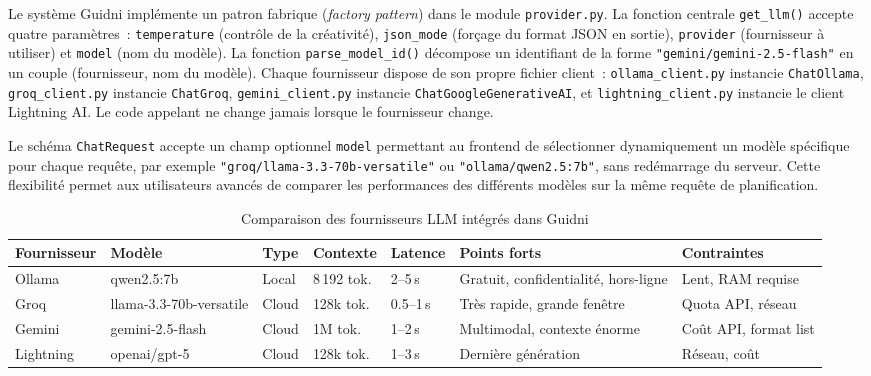 Le système Guidni implémente un patron fabrique (\textit{factory pattern}) dans le module
\texttt{provider.py}. La fonction centrale \texttt{get\_llm()} accepte quatre paramètres~:
\texttt{temperature} (contrôle de la créativité), \texttt{json\_mode} (forçage du format JSON
en sortie), \texttt{provider} (fournisseur à utiliser) et \texttt{model} (nom du modèle). La
fonction \texttt{parse\_model\_id()} décompose un identifiant de la forme
\texttt{"gemini/gemini-2.5-flash"} en un couple (fournisseur, nom du modèle). Chaque fournisseur
dispose de son propre fichier client~: \texttt{ollama\_client.py} instancie \texttt{ChatOllama},
\texttt{groq\_client.py} instancie \texttt{ChatGroq}, \texttt{gemini\_client.py} instancie
\texttt{ChatGoogleGenerativeAI}, et \texttt{lightning\_client.py} instancie le client Lightning AI.
Le code appelant ne change jamais lorsque le fournisseur change.

Le schéma \texttt{ChatRequest} accepte un champ optionnel \texttt{model} permettant au frontend
de sélectionner dynamiquement un modèle spécifique pour chaque requête, par exemple
\texttt{"groq/llama-3.3-70b-versatile"} ou \texttt{"ollama/qwen2.5:7b"}, sans redémarrage du
serveur. Cette flexibilité permet aux utilisateurs avancés de comparer les performances des
différents modèles sur la même requête de planification.

\begin{table}[H]
    \centering
    \caption{Comparaison des fournisseurs LLM intégrés dans Guidni}
    \label{tab:llm_providers}
    \small
    \begin{tabular}{p{1.8cm} p{2.8cm} p{1.2cm} p{1.5cm} p{1.3cm} p{2.5cm} p{2.5cm}}
        \toprule
        \textbf{Fournisseur} & \textbf{Modèle} & \textbf{Type} & \textbf{Contexte} &
        \textbf{Latence} & \textbf{Points forts} & \textbf{Contraintes} \\
        \midrule
        Ollama & qwen2.5:7b & Local & 8\,192 tok. & 2--5\,s &
        Gratuit, confidentialité, hors-ligne & Lent, RAM requise \\[4pt]
        Groq & llama-3.3-70b-versatile & Cloud & 128k tok. & 0.5--1\,s &
        Très rapide, grande fenêtre & Quota API, réseau \\[4pt]
        Gemini & gemini-2.5-flash & Cloud & 1M tok. & 1--2\,s &
        Multimodal, contexte énorme & Coût API, format list \\[4pt]
        Lightning & openai/gpt-5 & Cloud & 128k tok. & 1--3\,s &
        Dernière génération & Réseau, coût \\
        \bottomrule
    \end{tabular}
\end{table}

